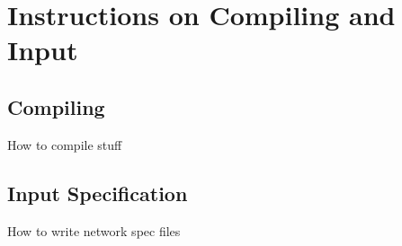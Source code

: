 \documentclass[12pt]{article}
\begin{document}
\appendix
\section{Instructions on Compiling and Input}

\subsection{Compiling}
How to compile stuff


\subsection{Input Specification}
How to write network spec files
\end{document}
